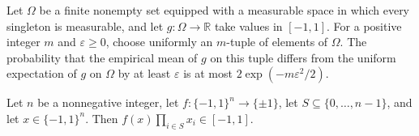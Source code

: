 \begin{theorem}
\label{FABL.measure_finiteUniformEmpiricalMean_sub_expect_ge_le}
\leanok
{}
Let $\Omega$ be a finite nonempty set equipped with a measurable space in which every
singleton is measurable, and let $g:\Omega\to\mathbb R$ take values in $[-1,1]$. For
a positive integer $m$ and $\varepsilon\ge0$, choose uniformly an $m$-tuple of
elements of $\Omega$. The probability that the empirical mean of $g$ on this tuple
differs from the uniform expectation of $g$ on $\Omega$ by at least $\varepsilon$ is
at most $2\exp(-m\varepsilon^2/2)$.
\end{theorem}

\begin{theorem}
\label{FABL.fourierObservation_mem_Icc}
\leanok
{}
Let $n$ be a nonnegative integer, let $f:\{-1,1\}^n\to\{\pm1\}$, let
$S\subseteq\{0,\ldots,n-1\}$, and let $x\in\{-1,1\}^n$. Then $f(x)\prod_{i\in
S}x_i\in[-1,1]$.
\end{theorem}

